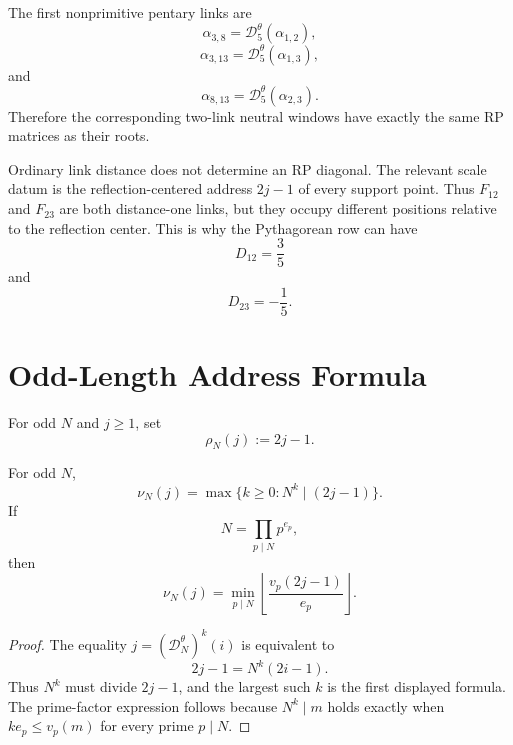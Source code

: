 \begin{example}
\label{ex:innovation-input-first-nonprimitive-pentary-links}
The first nonprimitive pentary links are
$$
\alpha_{3,8}
=
\mathcal D_5^\theta(\alpha_{1,2}),
$$
$$
\alpha_{3,13}
=
\mathcal D_5^\theta(\alpha_{1,3}),
$$
and
$$
\alpha_{8,13}
=
\mathcal D_5^\theta(\alpha_{2,3}).
$$
Therefore the corresponding two-link neutral windows have exactly the
same RP matrices as their roots.
\end{example}

\begin{principle}
\label{prin:innovation-input-reflection-centered-address-not-distance}
Ordinary link distance does not determine an RP diagonal. The relevant
scale datum is the reflection-centered address $2j-1$ of every support
point. Thus $F_{12}$ and $F_{23}$ are both distance-one links, but they
occupy different positions relative to the reflection center. This is why
the Pythagorean row can have
$$
D_{12}=\frac35
$$
and
$$
D_{23}=-\frac15.
$$
\end{principle}



\section{Odd-Length Address Formula}
\label{sec:innovation-input-odd-length-address-formula}

\begin{definition}
\label{def:innovation-input-reflection-centered-n-address}
For odd $N$ and $j\ge1$, set
$$
\rho_N(j):=2j-1.
$$
\end{definition}

\begin{theorem}
\label{thm:innovation-input-odd-length-scale-order}
For odd $N$,
$$
\nu_N(j)=\max\{k\ge0:N^k\mid(2j-1)\}.
$$
If
$$
N=\prod_{p\mid N}p^{e_p},
$$
then
$$
\nu_N(j)
=
\min_{p\mid N}
\left\lfloor
\frac{v_p(2j-1)}{e_p}
\right\rfloor.
$$
\end{theorem}

\begin{proof}
The equality $j=(\mathcal D_N^\theta)^k(i)$ is equivalent to
$$
2j-1=N^k(2i-1).
$$
Thus $N^k$ must divide $2j-1$, and the largest such $k$ is the first
displayed formula. The prime-factor expression follows because
$N^k\mid m$ holds exactly when $ke_p\le v_p(m)$ for every prime
$p\mid N$.
\end{proof}

